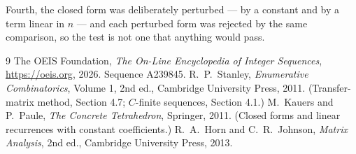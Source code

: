 \documentclass[11pt,a4paper]{article}
\theoremstyle{plain}
\theoremstyle{definition}
\begin{document}
Fourth, the closed form was deliberately perturbed --- by a constant and by a term linear in
$n$ --- and each perturbed form was rejected by the same comparison, so the test is not one
that anything would pass.

\begin{thebibliography}{9}
 The OEIS Foundation, \emph{The On-Line Encyclopedia of Integer
Sequences}, \url{https://oeis.org}, 2026. Sequence A239845.
 R.~P.~Stanley, \emph{Enumerative Combinatorics}, Volume 1, 2nd ed.,
Cambridge University Press, 2011. (Transfer-matrix method, Section 4.7; $C$-finite sequences,
Section 4.1.)
 M.~Kauers and P.~Paule, \emph{The Concrete Tetrahedron}, Springer, 2011.
(Closed forms and linear recurrences with constant coefficients.)
 R.~A.~Horn and C.~R.~Johnson, \emph{Matrix Analysis}, 2nd ed., Cambridge
University Press, 2013.
\end{thebibliography}
\end{document}
